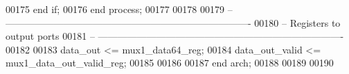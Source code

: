 \begin{DoxyCode}
00175     \textcolor{keywordflow}{end} \textcolor{keywordflow}{if};
00176 \textcolor{keywordflow}{end} \textcolor{keywordflow}{process};
00177 
00178 
00179 \textcolor{keyword}{-- ----------------------------------------------------------------------------}
00180 \textcolor{keyword}{-- Registers to output ports}
00181 \textcolor{keyword}{-- ----------------------------------------------------------------------------}
00182 
00183 \textcolor{vhdlchar}{data_out}        \textcolor{vhdlchar}{<=} \textcolor{vhdlchar}{mux1_data64_reg};
00184 \textcolor{vhdlchar}{data_out_valid} \textcolor{vhdlchar}{<=}   \textcolor{vhdlchar}{mux1_data_out_valid_reg};
00185 
00186 
00187 \textcolor{keywordflow}{end} \textcolor{vhdlchar}{arch};   
00188 
00189 
00190 
\end{DoxyCode}
